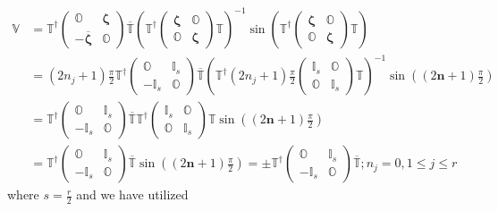 \documentclass[aps, preprint]{revtex4}
\begin{document}
\begin{align}\mathbb{V} &  =\mathbb{T}^{ \dag } \left (\begin{array}{cc}\mathbb{O} & \mathbf{\zeta } \\
 -\overline{\mathbf{\zeta }} & \mathbb{O}\end{array}\right ) \overline{\mathbb{T}} \left (\mathbb{T}^{ \dag } \left (\begin{array}{cc}\mathbf{\zeta } & \mathbb{O} \\
\mathbb{O} & \mathbf{\zeta }\end{array}\right ) \mathbb{T}\right )^{ -1} \sin  \left (\mathbb{T}^{ \dag } \left (\begin{array}{cc}\mathbf{\zeta } & \mathbb{O} \\
\mathbb{O} & \mathbf{\zeta }\end{array}\right ) \mathbb{T}\right ) \\
 &  =\left (2 n_{j} +1\right ) \frac{\pi }{2} \mathbb{T}^{ \dag } \left (\begin{array}{cc}\mathbb{O} & \mathbb{I}_{s} \\
 -\mathbb{I}_{s} & \mathbb{O}\end{array}\right ) \overline{\mathbb{T}} \left (\mathbb{T}^{ \dag } \left (2 n_{j} +1\right ) \frac{\pi }{2} \left (\begin{array}{cc}\mathbb{I}_{s} & \mathbb{O} \\
\mathbb{O} & \mathbb{I}_{s}\end{array}\right ) \mathbb{T}\right )^{ -1} \sin  \left (\left (2 \mathbf{n} +1\right ) \frac{\pi }{2}\right ) \\
 &  =\mathbb{T}^{ \dag } \left (\begin{array}{cc}\mathbb{O} & \mathbb{I}_{s} \\
 -\mathbb{I}_{s} & \mathbb{O}\end{array}\right ) \overline{\mathbb{T}} \mathbb{T}^{ \dag } \left (\begin{array}{cc}\mathbb{I}_{s} & \mathbb{O} \\
\mathbb{O} & \mathbb{I}_{s}\end{array}\right ) \mathbb{T} \sin  \left (\left (2 \mathbf{n} +1\right ) \frac{\pi }{2}\right ) \\
 &  =\mathbb{T}^{ \dag } \left (\begin{array}{cc}\mathbb{O} & \mathbb{I}_{s} \\
 -\mathbb{I}_{s} & \mathbb{O}\end{array}\right ) \overline{\mathbb{T}} \sin  \left (\left (2 \mathbf{n} +1\right ) \frac{\pi }{2}\right ) = \pm \mathbb{T}^{ \dag } \left (\begin{array}{cc}\mathbb{O} & \mathbb{I}_{s} \\
 -\mathbb{I}_{s} & \mathbb{O}\end{array}\right ) \overline{\mathbb{T}} ;n_{j} =0 ,1 \leq j \leq r\end{align}where $s =\frac{r}{2}$ and we have utilized
\end{document}
